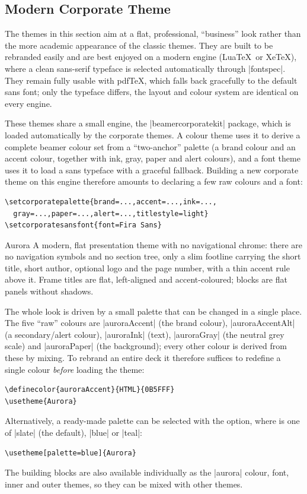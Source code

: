 \subsection{Modern Corporate Theme}

The themes in this section aim at a flat, professional, ``business'' look rather than the more academic appearance of the classic themes. They are built to be rebranded easily and are best enjoyed on a modern engine (Lua\TeX\ or Xe\TeX), where a clean sans-serif typeface is selected automatically through |fontspec|. They remain fully usable with pdf\TeX, which falls back gracefully to the default sans font; only the typeface differs, the layout and colour system are identical on every engine.

These themes share a small engine, the |beamercorporatekit| package, which is loaded automatically by the corporate themes. A colour theme uses it to derive a complete beamer colour set from a ``two-anchor'' palette (a brand colour and an accent colour, together with ink, gray, paper and alert colours), and a font theme uses it to load a sans typeface with a graceful fallback. Building a new corporate theme on this engine therefore amounts to declaring a few raw colours and a font:
\begin{verbatim}
\setcorporatepalette{brand=...,accent=...,ink=...,
  gray=...,paper=...,alert=...,titlestyle=light}
\setcorporatesansfont{font=Fira Sans}
\end{verbatim}

\begin{themeexample}{Aurora}
  A modern, flat presentation theme with no navigational chrome: there are no navigation symbols and no section tree, only a slim footline carrying the short title, short author, optional logo and the page number, with a thin accent rule above it. Frame titles are flat, left-aligned and accent-coloured; blocks are flat panels without shadows.

  The whole look is driven by a small palette that can be changed in a single place. The five ``raw'' colours are |auroraAccent| (the brand colour), |auroraAccentAlt| (a secondary/alert colour), |auroraInk| (text), |auroraGray| (the neutral grey scale) and |auroraPaper| (the background); every other colour is derived from these by mixing. To rebrand an entire deck it therefore suffices to redefine a single colour \emph{before} loading the theme:
\begin{verbatim}
\definecolor{auroraAccent}{HTML}{0B5FFF}
\usetheme{Aurora}
\end{verbatim}

  Alternatively, a ready-made palette can be selected with the  option, where  is one of |slate| (the default), |blue| or |teal|:
\begin{verbatim}
\usetheme[palette=blue]{Aurora}
\end{verbatim}

  The building blocks are also available individually as the |aurora| colour, font, inner and outer themes, so they can be mixed with other themes.
\end{themeexample}

